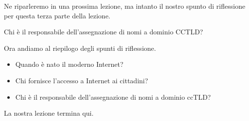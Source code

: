 Ne riparleremo in una prossima lezione, ma intanto il nostro spunto di riflessione per questa terza parte della lezione.

Chi è il responsabile dell'assegnazione di nomi a dominio CCTLD? 

Ora andiamo al riepilogo degli spunti di riflessione.

\begin{itemize}
    \item Quando è nato il moderno Internet?
    \item Chi fornisce l'accesso a Internet ai cittadini?
    \item Chi è il responsabile dell'assegnazione di nomi a dominio ccTLD?

\end{itemize}
La nostra lezione termina qui.
